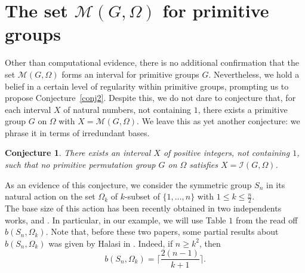 \documentclass{amsart}
\newtheorem{conjecture}[theorem]{Conjecture}
\begin{document}
\section{The set $\mathcal{M}(G,\Omega)$  for primitive groups}\label{last}
Other than computational evidence, there is no additional confirmation that the set $\mathcal{M}(G,\Omega)$ forms an interval for primitive groups $G$. Nevertheless, 
we hold a belief in a certain level of regularity within primitive groups, prompting us to propose Conjecture~\ref{conj2}. Despite this, we do not dare to conjecture that, for each interval $X$ of natural numbers, not containing $1$, there exists a primitive group $G$ on $\Omega$ with $X=\mathcal{M}(G,\Omega)$. We leave this as yet another conjecture: we phrase it in terms of irredundant bases.
\begin{conjecture}\label{conj2_2}
There exists an interval  $X$ of positive integers, not containing $1$, such that no primitive permutation group $G$ on $\Omega$ satisfies $X=\mathcal{I}(G,\Omega)$.
	\end{conjecture}
	As an evidence of this conjecture, we consider the symmetric group $S_n$ in its natural action on the set $\Omega_k$ of $k$-subset of $\{1,\dots,n\}$ with $1 \leq k \leq \frac{n}{2}$. \\
	The base size of this action has been recently obtained in two independents works, \cite{DVCR} and \cite{MSp}. In particular, in our example, we will use Table $1$ from \cite{MSp} the read off $b(S_n,\Omega_k)$. Note that, before these two papers, some partial results about $b(S_n, \Omega_k)$ was given by Halasi in \cite{halasi}. Indeed, if $n \geq k^2$, then
	\[
		b(S_n,\Omega_k) = \bigg \lceil \frac{2(n-1)}{k+1} \bigg \rceil. 
	\]
	
\end{document}
